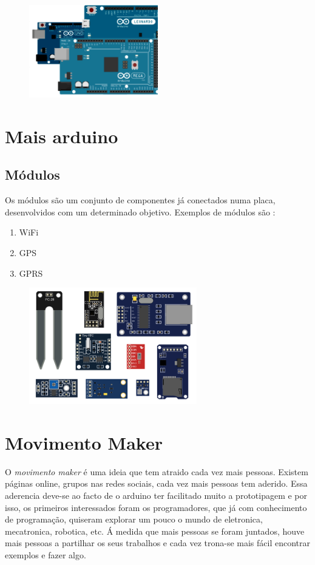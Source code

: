 \documentclass{article}
\begin{document}
\begin{figure}[h]
\centering
\includegraphics[width=0.5\textwidth]{img/arduino}
\end{figure}

\section{Mais arduino}

\subsection{Módulos}
Os módulos são um conjunto de componentes já conectados numa placa, desenvolvidos com um determinado objetivo. Exemplos de módulos são :
\begin{enumerate}
\item WiFi
\item GPS
\item GPRS
\end{enumerate}

\begin{figure}[h]
\centering
\includegraphics[width=0.65\textwidth]{img/shields}
\end{figure}

\section{Movimento Maker}
O \textit{movimento maker} é uma ideia que tem atraido cada vez mais pessoas. Existem páginas online, grupos nas redes sociais, cada vez mais pessoas tem aderido. Essa aderencia deve-se ao facto de o arduino ter facilitado muito a prototipagem e por isso, os primeiros interessados foram os programadores, que já com conhecimento de programação, quiseram explorar um pouco o mundo de eletronica, mecatronica, robotica, etc.\newline
Á medida que mais pessoas se foram juntados, houve mais pessoas a partilhar os seus trabalhos e cada vez trona-se mais fácil encontrar exemplos e fazer algo.
\end{document}
